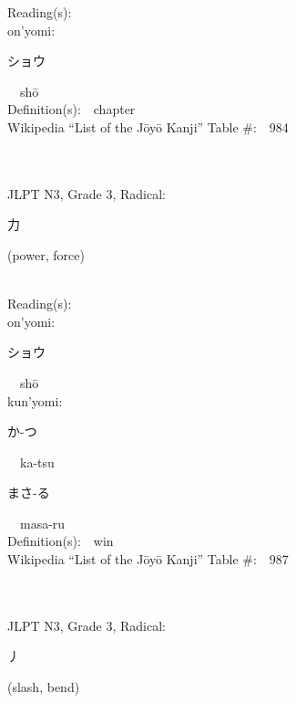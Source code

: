 \begin{multicols}{2}
Reading(s):\ \ \\
{\hspace*{1em}}on'yomi:\ \ \\
{\hspace*{2em}}{\begin{CJK}{UTF8}{min} ショウ \end{CJK}}\ \ sh\=o\ \ \\
Definition(s):\ \ chapter \\
Wikipedia ``List of the J\=oy\=o Kanji'' Table \#:\ \ 984 \\
\ \ \\
{\fontsize{34pt}{40pt}  }\ \ \\  %
{JLPT N3, Grade 3, Radical:\ \ {\begin{CJK}{UTF8}{min} 力 \end{CJK}} (power, force) } \\
Reading(s):\ \ \\
{\hspace*{1em}}on'yomi:\ \ \\
{\hspace*{2em}}{\begin{CJK}{UTF8}{min} ショウ \end{CJK}}\ \ sh\=o\ \ \\
{\hspace*{1em}}kun'yomi:\ \ \\
{\hspace*{2em}}{\begin{CJK}{UTF8}{min} か-つ \end{CJK}}\ \ ka-tsu\ \ \\
{\hspace*{2em}}{\begin{CJK}{UTF8}{min} まさ-る \end{CJK}}\ \ masa-ru\ \ \\
Definition(s):\ \ win \\
Wikipedia ``List of the J\=oy\=o Kanji'' Table \#:\ \ 987 \\
\ \ \\
{\fontsize{34pt}{40pt}  }\ \ \\  %
{JLPT N3, Grade 3, Radical:\ \ {\begin{CJK}{UTF8}{min} 丿 \end{CJK}} (slash, bend) } \\

\end{multicols}
